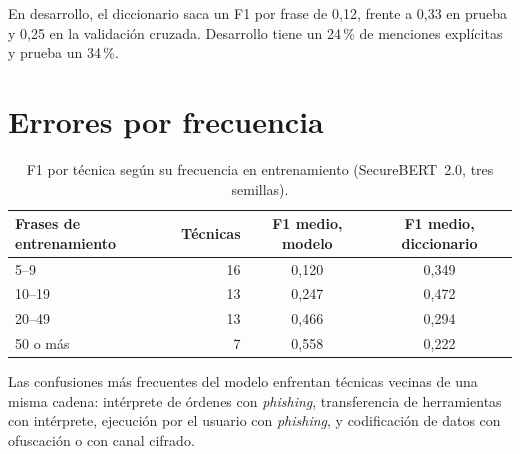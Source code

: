 \begin{table}[H]
\centering
\small
{}
\caption{Validación cruzada por informe. Unión frente a modelo: +0,040 de F1 por frase
[+0,020, +0,060] y +0,076 por informe [+0,042, +0,109].}
\end{table}

En desarrollo, el diccionario saca un F1 por frase de 0,12, frente a 0,33 en prueba y 0,25 en la
validación cruzada. Desarrollo tiene un 24\,\% de menciones explícitas y prueba un 34\,\%.

\section{Errores por frecuencia}

\begin{table}[H]
\centering
\begin{tabular}{|l|r|c|c|}
\hline
\textbf{Frases de entrenamiento} & \textbf{Técnicas} & \textbf{F1 medio, modelo} & \textbf{F1 medio, diccionario} \\
\hline
5--9 & 16 & 0,120 & 0,349 \\
10--19 & 13 & 0,247 & 0,472 \\
20--49 & 13 & 0,466 & 0,294 \\
50 o más & 7 & 0,558 & 0,222 \\
\hline
\end{tabular}
\caption{F1 por técnica según su frecuencia en entrenamiento (SecureBERT~2.0, tres semillas).}
\end{table}

Las confusiones más frecuentes del modelo enfrentan técnicas vecinas de una misma cadena:
intérprete de órdenes con \textit{phishing}, transferencia de herramientas con intérprete,
ejecución por el usuario con \textit{phishing}, y codificación de datos con ofuscación o con canal
cifrado.

